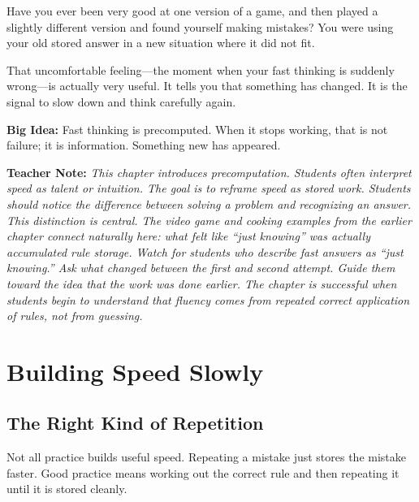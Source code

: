 \documentclass[12pt]{book}
\newenvironment{teachernote}
{\par\medskip\noindent\textbf{Teacher Note:} \itshape}
{\par\medskip}
\begin{document}
Have you ever been very good at one version of a game, and then played a
slightly different version and found yourself making mistakes? You were
using your old stored answer in a new situation where it did not fit.

That uncomfortable feeling---the moment when your fast thinking is suddenly
wrong---is actually very useful. It tells you that something has changed.
It is the signal to slow down and think carefully again.

\textbf{Big Idea:} Fast thinking is precomputed. When it stops working, that
is not failure; it is information. Something new has appeared.

\begin{teachernote}
This chapter introduces precomputation. Students often interpret speed as
talent or intuition. The goal is to reframe speed as stored work. Students
should notice the difference between solving a problem and recognizing an
answer. This distinction is central. The video game and cooking examples
from the earlier chapter connect naturally here: what felt like ``just
knowing'' was actually accumulated rule storage. Watch for students who
describe fast answers as ``just knowing.'' Ask what changed between the
first and second attempt. Guide them toward the idea that the work was
done earlier. The chapter is successful when students begin to understand
that fluency comes from repeated correct application of rules, not from
guessing.
\end{teachernote}

\chapter{Building Speed Slowly}

\section{The Right Kind of Repetition}

Not all practice builds useful speed. Repeating a mistake just stores the
mistake faster. Good practice means working out the correct rule and then
repeating it until it is stored cleanly.
\end{document}
